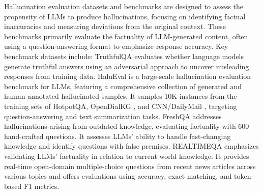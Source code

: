Hallucination evaluation datasets and benchmarks are designed to assess the propensity of LLMs to produce hallucinations, focusing on identifying factual inaccuracies and measuring deviations from the original context. These benchmarks primarily evaluate the factuality of LLM-generated content, often using a question-answering format to emphasize response accuracy. Key benchmark datasets include: TruthfulQA evaluates whether language models generate truthful answers using an adversarial approach to uncover misleading responses from training data. HaluEval \cite{li2023halueval}is a large-scale hallucination evaluation benchmark for LLMs, featuring a comprehensive collection of generated and human-annotated hallucinated samples. It samples 10K instances from the training sets of HotpotQA, OpenDialKG \cite{Moon2019OpenDialKGEC}, and CNN/DailyMail \cite{see2017get}, targeting question-answering and text summarization tasks. FreshQA addresses hallucinations arising from outdated knowledge, evaluating factuality with 600 hand-crafted questions. It assesses LLMs' ability to handle fast-changing knowledge and identify questions with false premises. REALTIMEQA \cite{kasai2024realtime} emphasizes validating LLMs' factuality in relation to current world knowledge. It provides real-time open-domain multiple-choice questions from recent news articles across various topics and offers evaluations using accuracy, exact matching, and token-based F1 metrics.